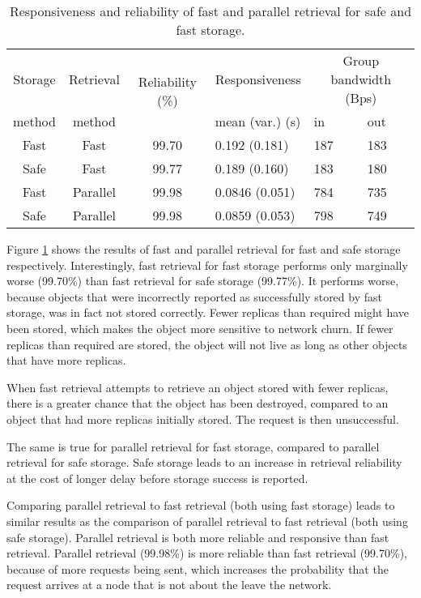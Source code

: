\begin{table}[htbp]
\centering
\begin{tabular}{|c|c|c|l|l|l|}
\hline
Storage & Retrieval & \multirow{2}{*}{Reliability (\%)} & Responsiveness & \multicolumn{2}{c|}{Group bandwidth (Bps)} \\
\cline{5-6}
   method      &     method       &             &mean (var.) (s)& in&out\\
\hline
Fast           &   Fast           &   99.70    &  0.192 (0.181) & 187&183\\
Safe           &   Fast           &   99.77    &  0.189 (0.160) & 183&180\\
Fast           &   Parallel       &   99.98    &  0.0846 (0.051)& 784&735\\
Safe           &   Parallel       &   99.98    &  0.0859 (0.053)& 798&749\\
\hline
\end{tabular}
\caption{Responsiveness and reliability of fast and parallel retrieval for safe and fast storage.}
\label{tab_pithos_results}
\end{table}
%
Figure \ref{tab_pithos_results} shows the results of fast and parallel retrieval for fast and safe storage respectively. Interestingly, fast retrieval for fast storage performs only marginally worse (99.70\%) than fast retrieval for safe storage (99.77\%). It performs worse, because objects that were incorrectly reported as successfully stored by fast storage, was in fact not stored correctly. Fewer replicas than required might have been stored, which makes the object more sensitive to network churn. If fewer replicas than required are stored, the object will not live as long as other objects that have more replicas.

When fast retrieval attempts to retrieve an object stored with fewer replicas, there is a greater chance that the object has been destroyed, compared to an object that had more replicas initially stored. The request is then unsuccessful.

The same is true for parallel retrieval for fast storage, compared to parallel retrieval for safe storage. Safe storage leads to an increase in retrieval reliability at the cost of longer delay before storage success is reported.

Comparing parallel retrieval to fast retrieval (both using fast storage) leads to similar results as the comparison of parallel retrieval to fast retrieval (both using safe storage). Parallel retrieval is both more reliable and responsive than fast retrieval. Parallel retrieval (99.98\%) is more reliable than fast retrieval (99.70\%), because of more requests being sent, which increases the probability that the request arrives at a node that is not about the leave the network.

